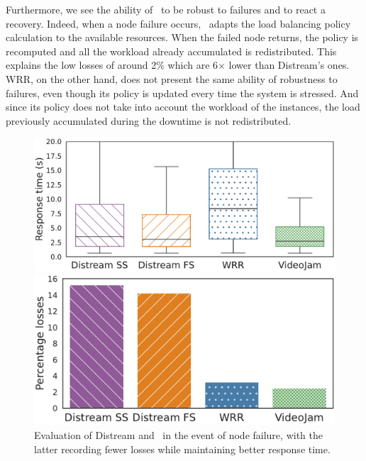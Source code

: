 Furthermore, we see the ability of~\videojam{} to be robust to failures and to react a recovery. Indeed, when a node failure occurs,~\videojam{} adapts the load balancing policy calculation to the available resources. When the failed node returns, the policy is recomputed and all the workload already accumulated is redistributed. This explains the low losses of around 2\% which are 6$\times$ lower than Distream's ones. WRR, on the other hand, does not present the same ability of robustness to failures, even though its policy is updated every time the system is stressed. And since its policy does not take into account the workload of the instances, the load previously accumulated during the downtime is not redistributed.

\begin{figure}
	\begin{minipage}[t]{.52\linewidth}
		\centering
		\includegraphics[width=\linewidth]{chapters/videojam/images/distream_vs_videojam/onfailure/response_time.pdf}
	\end{minipage}
	\hfill
	\begin{minipage}[t]{.46\linewidth}
		\centering
		\includegraphics[width=\linewidth]{chapters/videojam/images/distream_vs_videojam/onfailure/percentage_losses.pdf}
	\end{minipage}
	\vspace{-1mm}
	\caption{Evaluation of Distream and~\videojam{} in the event of node failure, with the latter recording fewer losses while maintaining better response time.}
	\vspace{-3mm}
	\label{fig:distream_vs_videojam_onfailure}
\end{figure}



